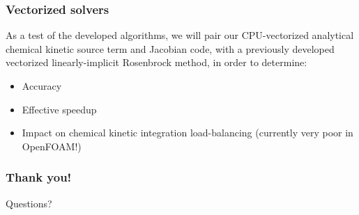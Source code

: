 \documentclass{beamer}
\begin{document}
\begin{frame}
 \frametitle{Vectorized solvers}
 As a test of the developed algorithms, we will pair our CPU-vectorized analytical chemical kinetic source term and Jacobian code, with a previously developed vectorized linearly-implicit Rosenbrock method, in order to determine:
 \begin{itemize}
  \item Accuracy
  \item Effective speedup
  \item Impact on chemical kinetic integration load-balancing (currently very poor in OpenFOAM!)
 \end{itemize}
\end{frame}

\begin{frame}
 \frametitle{Thank you!}
 Questions?
\end{frame}
\end{document}
